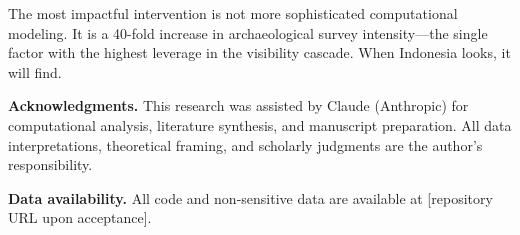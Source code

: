 \documentclass[12pt,a4paper]{article}
\begin{document}
The most impactful intervention is not more sophisticated computational modeling. It is a 40-fold increase in archaeological survey intensity---the single factor with the highest leverage in the visibility cascade. When Indonesia looks, it will find.

\medskip
\noindent\textbf{Acknowledgments.} This research was assisted by Claude (Anthropic) for computational analysis, literature synthesis, and manuscript preparation. All data interpretations, theoretical framing, and scholarly judgments are the author's responsibility.

\medskip
\noindent\textbf{Data availability.} All code and non-sensitive data are available at [repository URL upon acceptance].



\end{document}
